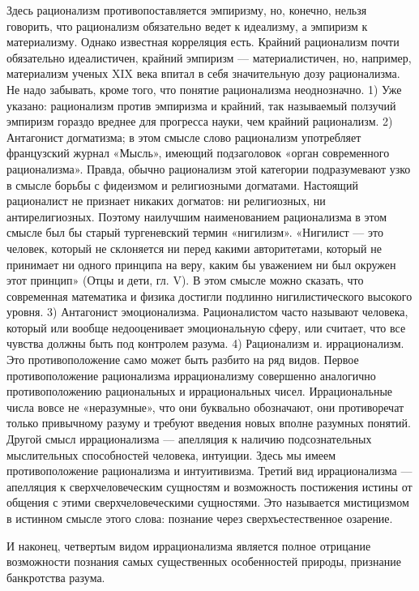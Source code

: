 Здесь   рационализм   противопоставляется  эмпиризму,   но,   конечно,
нельзя  говорить, что  рационализм  обязательно ведет  к идеализму,  а
эмпиризм  к материализму.  Однако известная  корреляция есть.  Крайний
рационализм  почти  обязательно  идеалистичен,  крайний  эмпиризм  ---
материалистичен, но,  например, материализм  ученых XIX века  впитал в
себя  значительную дозу  рационализма. Не  надо забывать,  кроме того,
что  понятие рационализма  неоднозначно. 1)  Уже указано:  рационализм
против  эмпиризма   и  крайний,   так  называемый   ползучий  эмпиризм
гораздо  вреднее  для прогресса  науки,  чем  крайний рационализм.  2)
Антагонист  догматизма; в  этом смысле  слово рационализм  употребляет
французский журнал  «Мысль», имеющий подзаголовок  «орган современного
рационализма». Правда, обычно рационализм этой категории подразумевают
узко в смысле  борьбы с фидеизмом и  религиозными догматами. Настоящий
рационалист  не   признает  никаких   догматов:  ни   религиозных,  ни
антирелигиозных. Поэтому  наилучшим наименованием рационализма  в этом
смысле  был бы  старый тургеневский  термин «нигилизм».  «Нигилист ---
это  человек,  который не  склоняется  ни  перед какими  авторитетами,
который  не   принимает  ни   одного  принципа   на  веру,   каким  бы
уважением  ни был  окружен  этот  принцип» (Отцы  и  дети,  гл. V).  В
этом  смысле  можно  сказать,  что  современная  математика  и  физика
достигли  подлинно  нигилистического  высокого уровня.  3)  Антагонист
эмоционализма.  Рационалистом  часто  называют человека,  который  или
вообще недооценивает эмоциональную сферу, или считает, что все чувства
должны  быть под  контролем разума.  4) Рационализм  и. иррационализм.
Это  противоположение само  может быть  разбито на  ряд видов.  Первое
противоположение  рационализма  иррационализму  совершенно  аналогично
противоположению рациональных  и иррациональных  чисел. Иррациональные
числа  вовсе  не  «неразумные»,  что  они  буквально  обозначают,  они
противоречат  только  привычному  разуму   и  требуют  введения  новых
вполне разумных  понятий. Другой смысл иррационализма  --- апелляция к
наличию подсознательных мыслительных  способностей человека, интуиции.
Здесь мы  имеем противоположение  рационализма и  интуитивизма. Третий
вид  иррационализма  ---  апелляция к  сверхчеловеческим  сущностям  и
возможность постижения  истины от  общения с  этими сверхчеловеческими
сущностями. Это называется мистицизмом  в истинном смысле этого слова:
познание через сверхъестественное озарение.

И наконец,  четвертым видом  иррационализма является  полное отрицание
возможности   познания   самых  существенных   особенностей   природы,
признание банкротства разума.


